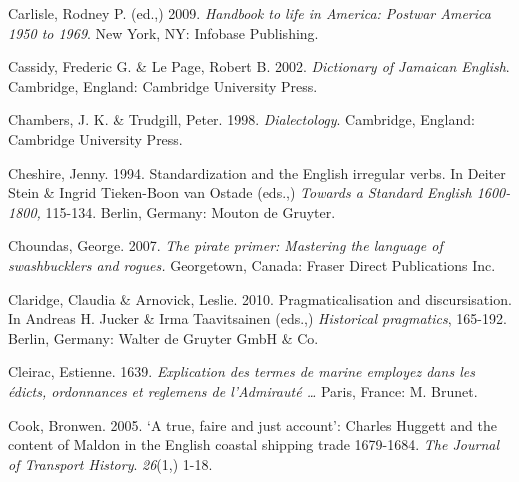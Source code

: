 \begin{styleStandard}
Carlisle, Rodney P. (ed.,) 2009. \textit{Handbook to life in America: Postwar America 1950 to 1969}. New York, NY: Infobase Publishing. 
\end{styleStandard}

\begin{styleStandard}
Cassidy, Frederic G. \& Le Page, Robert B. 2002. \textit{Dictionary of Jamaican English}. Cambridge, England: Cambridge University Press.
\end{styleStandard}

\begin{styleStandard}
Chambers, J. K. \& Trudgill, Peter. 1998. \textit{Dialectology}. Cambridge, England: Cambridge University Press. 
\end{styleStandard}

\begin{styleStandard}
Cheshire, Jenny. 1994. Standardization and the English irregular verbs. In Deiter Stein \& Ingrid Tieken-Boon van Ostade (eds.,) \textit{Towards a Standard English 1600-1800, }115-134.\textit{ }Berlin, Germany: Mouton de Gruyter. 
\end{styleStandard}

\begin{styleStandard}
Choundas, George. 2007. \textit{The pirate primer: Mastering the language of swashbucklers and} \textit{rogues.} Georgetown, Canada: Fraser Direct Publications Inc.
\end{styleStandard}

\begin{styleStandard}
Claridge, Claudia \& Arnovick, Leslie. 2010. Pragmaticalisation and discursisation. In Andreas H. Jucker \& Irma Taavitsainen (eds.,) \textit{Historical pragmatics}, 165-192. Berlin, Germany: Walter de Gruyter GmbH \& Co.
\end{styleStandard}

\begin{styleStandard}
Cleirac, Estienne. 1639. \textit{Explication des termes de marine employez dans les édicts, ordonnances et reglemens de l’Admirauté …} Paris, France: M. Brunet. 
\end{styleStandard}

\begin{styleStandard}
Cook, Bronwen. 2005. ‘A true, faire and just account’: Charles Huggett and the content of Maldon in the English coastal shipping trade 1679-1684. \textit{The Journal of Transport History}. \textit{26}(1,) 1-18.
\end{styleStandard}

